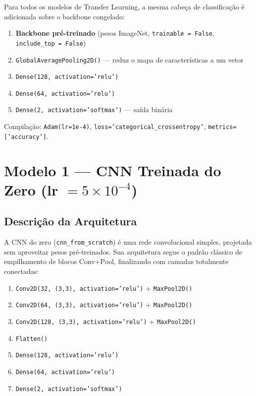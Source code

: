 \documentclass[12pt,a4paper]{article}
\begin{document}
Para todos os modelos de Transfer Learning, a mesma cabeça de classificação
é adicionada sobre o backbone congelado:

\begin{enumerate}
  \item \textbf{Backbone pré-treinado} (pesos ImageNet, \texttt{trainable = False},
        \texttt{include\_top = False})
  \item \texttt{GlobalAveragePooling2D()} --- reduz o mapa de características a um vetor
  \item \texttt{Dense(128, activation='relu')}
  \item \texttt{Dense(64, activation='relu')}
  \item \texttt{Dense(2, activation='softmax')} --- saída binária
\end{enumerate}

Compilação: \texttt{Adam(lr=1e-4)}, \texttt{loss='categorical\_crossentropy'},
\texttt{metrics=['accuracy']}.

\section{Modelo 1 --- CNN Treinada do Zero (lr $= 5\times10^{-4}$)}
\label{sec:cnn_scratch_5e4}

\subsection{Descrição da Arquitetura}

A CNN do zero (\texttt{cnn\_from\_scratch}) é uma rede convolucional simples,
projetada sem aproveitar pesos pré-treinados. Sua arquitetura segue o padrão
clássico de empilhamento de blocos Conv+Pool, finalizando com camadas totalmente
conectadas:

\begin{enumerate}
  \item \texttt{Conv2D(32, (3,3), activation='relu')} + \texttt{MaxPool2D()}
  \item \texttt{Conv2D(64, (3,3), activation='relu')} + \texttt{MaxPool2D()}
  \item \texttt{Conv2D(128, (3,3), activation='relu')} + \texttt{MaxPool2D()}
  \item \texttt{Flatten()}
  \item \texttt{Dense(128, activation='relu')}
  \item \texttt{Dense(64, activation='relu')}
  \item \texttt{Dense(2, activation='softmax')}
\end{enumerate}
\end{document}
